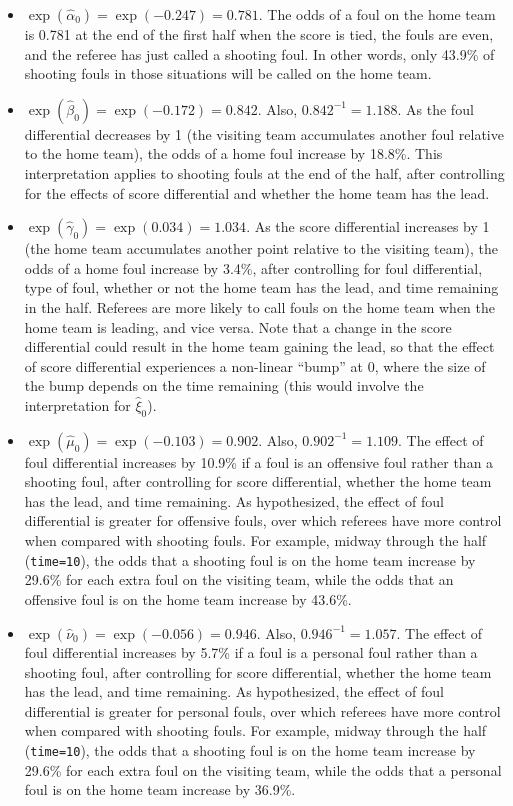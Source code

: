 \documentclass[
]{krantz}
\providecommand{\tightlist}{%
  \setlength{\itemsep}{0pt}\setlength{\parskip}{0pt}}
\begin{document}
\begin{itemize}
\tightlist
\item
  \(\exp(\hat{\alpha}_{0})=\exp(-0.247)=0.781\). The odds of a foul on the home team is 0.781 at the end of the first half when the score is tied, the fouls are even, and the referee has just called a shooting foul. In other words, only 43.9\% of shooting fouls in those situations will be called on the home team.
\item
  \(\exp(\hat{\beta}_{0})=\exp(-0.172)=0.842\). Also, \(0.842^{-1}=1.188\). As the foul differential decreases by 1 (the visiting team accumulates another foul relative to the home team), the odds of a home foul increase by 18.8\%. This interpretation applies to shooting fouls at the end of the half, after controlling for the effects of score differential and whether the home team has the lead.
\item
  \(\exp(\hat{\gamma}_{0})=\exp(0.034)=1.034\). As the score differential increases by 1 (the home team accumulates another point relative to the visiting team), the odds of a home foul increase by 3.4\%, after controlling for foul differential, type of foul, whether or not the home team has the lead, and time remaining in the half. Referees are more likely to call fouls on the home team when the home team is leading, and vice versa. Note that a change in the score differential could result in the home team gaining the lead, so that the effect of score differential experiences a non-linear ``bump'' at 0, where the size of the bump depends on the time remaining (this would involve the interpretation for \(\hat{\xi}_{0}\)).
\item
  \(\exp(\hat{\mu}_{0})=\exp(-0.103)=0.902\). Also, \(0.902^{-1}=1.109\). The effect of foul differential increases by 10.9\% if a foul is an offensive foul rather than a shooting foul, after controlling for score differential, whether the home team has the lead, and time remaining. As hypothesized, the effect of foul differential is greater for offensive fouls, over which referees have more control when compared with shooting fouls. For example, midway through the half (\texttt{time=10}), the odds that a shooting foul is on the home team increase by 29.6\% for each extra foul on the visiting team, while the odds that an offensive foul is on the home team increase by 43.6\%.
\item
  \(\exp(\hat{\nu}_{0})=\exp(-0.056)=0.946\). Also, \(0.946^{-1}=1.057\). The effect of foul differential increases by 5.7\% if a foul is a personal foul rather than a shooting foul, after controlling for score differential, whether the home team has the lead, and time remaining. As hypothesized, the effect of foul differential is greater for personal fouls, over which referees have more control when compared with shooting fouls. For example, midway through the half (\texttt{time=10}), the odds that a shooting foul is on the home team increase by 29.6\% for each extra foul on the visiting team, while the odds that a personal foul is on the home team increase by 36.9\%.

\end{itemize}
\end{document}
